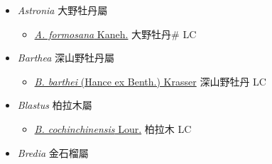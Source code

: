 
  \begin{itemize}
 \item[] \textit{Astronia} 大野牡丹屬
                    
  \begin{itemize}
        \item[] \href{http://www.theplantlist.org/tpl1.1/search?q=Astronia+formosana}{\textit{A. formosana} Kaneh.}   大野牡丹\# LC
  \end{itemize}
 \item[] \textit{Barthea} 深山野牡丹屬
                    
  \begin{itemize}
        \item[] \href{http://www.theplantlist.org/tpl1.1/search?q=Barthea+barthei}{\textit{B. barthei} (Hance ex Benth.) Krasser}   深山野牡丹 LC
  \end{itemize}
 \item[] \textit{Blastus} 柏拉木屬
                    
  \begin{itemize}
        \item[] \href{http://www.theplantlist.org/tpl1.1/search?q=Blastus+cochinchinensis}{\textit{B. cochinchinensis} Lour.}   柏拉木 LC
  \end{itemize}
 \item[] \textit{Bredia} 金石榴屬
                    

\end{itemize}
